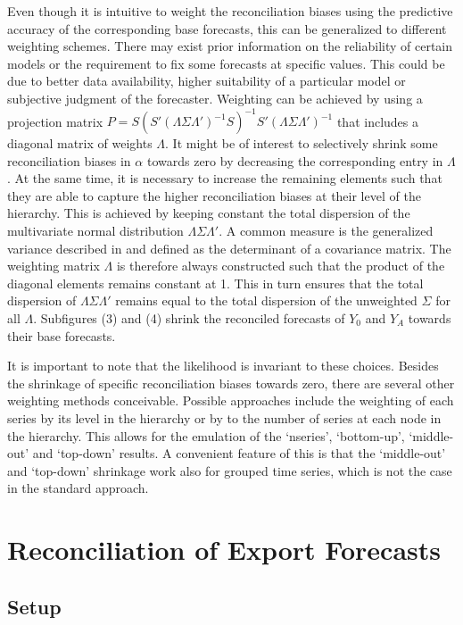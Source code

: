 \documentclass[a4paper,fleqn,11pt]{article}
\begin{document}
Even though it is intuitive to weight the reconciliation biases using the predictive accuracy of the corresponding base forecasts, this can be generalized to different weighting schemes. There may exist prior information on the reliability of certain models or the requirement to fix some forecasts at specific values. This could be due to better data availability, higher suitability of a particular model or subjective judgment of the forecaster. Weighting can be achieved by using a projection matrix $P= S(S'(\Lambda\Sigma\Lambda')^{-1}S)^{-1}S'(\Lambda\Sigma\Lambda')^{-1}$ that includes a diagonal matrix of weights $\Lambda$. It might be of interest to selectively shrink some reconciliation biases in $\alpha$ towards zero by decreasing the corresponding entry in $\Lambda$. At the same time, it is necessary to increase the remaining elements such that they are able to capture the higher reconciliation biases at their level of the hierarchy. This is achieved by keeping constant the total dispersion of the multivariate normal distribution $\Lambda\Sigma\Lambda'$. A common measure is the generalized variance described in \cite{Mustonen1997} and defined as the determinant of a covariance matrix. The weighting matrix $\Lambda$ is therefore always constructed such that the product of the diagonal elements remains constant at 1. This in turn ensures that the total dispersion of $\Lambda\Sigma\Lambda'$ remains equal to the total dispersion of the unweighted $\Sigma$ for all $\Lambda$. Subfigures (3) and (4) shrink the reconciled forecasts of $Y_0$ and $Y_A$ towards their base forecasts.

It is important to note that the likelihood is invariant to these choices. Besides the shrinkage of specific reconciliation biases towards zero, there are several other weighting methods conceivable. Possible approaches include the weighting of each series by its level in the hierarchy or by to the number of series at each node in the hierarchy. This allows for the emulation of the `nseries', `bottom-up', `middle-out' and `top-down' results. A convenient feature of this is that the `middle-out' and `top-down' shrinkage work also for grouped time series, which is not the case in the standard approach.

\section{Reconciliation of Export Forecasts}\label{sec:appl}

\subsection{Setup}
\end{document}

